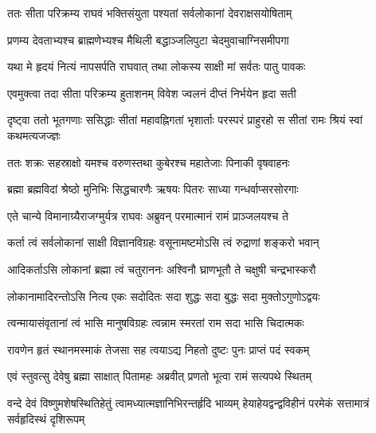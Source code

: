 \twolineshloka
{ततः सीता परिक्रम्य राघवं भक्तिसंयुता} %
{पश्यतां सर्वलोकानां देवराक्षसयोषिताम्}

\twolineshloka
{प्रणम्य देवताभ्यश्च ब्राह्मणेभ्यश्च मैथिली} %
{बद्धाञ्जलिपुटा चेदमुवाचाग्निसमीपगा}

\twolineshloka
{यथा मे हृदयं नित्यं नापसर्पति राघवात्} %
{तथा लोकस्य साक्षी मां सर्वतः पातु पावकः}

\twolineshloka
{एवमुक्त्वा तदा सीता परिक्रम्य हुताशनम्} %
{विवेश ज्वलनं दीप्तं निर्भयेन हृदा सती} %


\fourlineindentedshloka
{दृष्ट्वा ततो भूतगणाः ससिद्धाः}
{सीतां महावह्निगतां भृशार्ताः}
{परस्परं प्राहुरहो स सीतां}
{रामः श्रियं स्वां कथमत्यजज्ज्ञः} %






\twolineshloka
{ततः शक्रः सहस्राक्षो यमश्च वरुणस्तथा}
{कुबेरश्च महातेजाः पिनाकी वृषवाहनः} %

\twolineshloka
{ब्रह्मा ब्रह्मविदां श्रेष्ठो मुनिभिः सिद्धचारणैः}
{ऋषयः पितरः साध्या गन्धर्वाप्सरसोरगाः} %

\twolineshloka
{एते चान्ये विमानाग्र्यैराजग्मुर्यत्र राघवः}
{अब्रुवन् परमात्मानं रामं प्राञ्जलयश्च ते} %

\twolineshloka
{कर्ता त्वं सर्वलोकानां साक्षी विज्ञानविग्रहः}
{वसूनामष्टमोऽसि त्वं रुद्राणां शङ्करो भवान्} %

\twolineshloka
{आदिकर्ताऽसि लोकानां ब्रह्मा त्वं चतुराननः}
{अश्विनौ घ्राणभूतौ ते चक्षुषी चन्द्रभास्करौ} %

\twolineshloka
{लोकानामादिरन्तोऽसि नित्य एकः सदोदितः}
{सदा शुद्धः सदा बुद्धः सदा मुक्तोऽगुणोऽद्वयः} %

\twolineshloka
{त्वन्मायासंवृतानां त्वं भासि मानुषविग्रहः}
{त्वन्नाम स्मरतां राम सदा भासि चिदात्मकः} %

\twolineshloka
{रावणेन हृतं स्थानमस्माकं तेजसा सह}
{त्वयाऽद्य निहतो दुष्टः पुनः प्राप्तं पदं स्वकम्} %

\twolineshloka
{एवं स्तुवत्सु देवेषु ब्रह्मा साक्षात् पितामहः}
{अब्रवीत् प्रणतो भूत्वा रामं सत्यपथे स्थितम्} %



\fourlineindentedshloka
{वन्दे देवं विष्णुमशेषस्थितिहेतुं}
{त्वामध्यात्मज्ञानिभिरन्तर्हृदि भाव्यम्}
{हेयाहेयद्वन्द्वविहीनं परमेकं}
{सत्तामात्रं सर्वहृदिस्थं दृशिरूपम्} %


